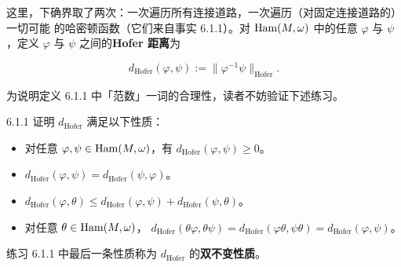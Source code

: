 

这里，下确界取了两次：一次遍历所有连接道路，一次遍历（对固定连接道路的）一切可能
的哈密顿函数（它们来自事实 6.1.1）。对 $\operatorname{Ham}(M,\omega)$ 中的任意 $\varphi$ 与
$\psi$，定义 $\varphi$ 与 $\psi$ 之间的\textbf{Hofer 距离}为

\[
  d_{\mathrm{Hofer}}(\varphi,\psi):=\|\varphi^{-1}\psi\|_{\mathrm{Hofer}}.
\]

为说明定义 6.1.1 中「范数」一词的合理性，读者不妨验证下述练习。

\begin{wexer}{6.1.1}
  证明 $d_{\mathrm{Hofer}}$ 满足以下性质：
  \begin{itemize}
    \item 对任意 $\varphi,\psi\in\operatorname{Ham}(M,\omega)$，有 $d_{\mathrm{Hofer}}(\varphi,\psi)\ge 0$。
    \item $d_{\mathrm{Hofer}}(\varphi,\psi)=d_{\mathrm{Hofer}}(\psi,\varphi)$。
    \item $d_{\mathrm{Hofer}}(\varphi,\theta)\le d_{\mathrm{Hofer}}(\varphi,\psi)
          +d_{\mathrm{Hofer}}(\psi,\theta)$。
    \item 对任意 $\theta\in\operatorname{Ham}(M,\omega)$，
          $d_{\mathrm{Hofer}}(\theta\varphi,\theta\psi)
          =d_{\mathrm{Hofer}}(\varphi\theta,\psi\theta)
          =d_{\mathrm{Hofer}}(\varphi,\psi)$。
  \end{itemize}
\end{wexer}

练习 6.1.1 中最后一条性质称为 $d_{\mathrm{Hofer}}$ 的\textbf{双不变性质}。

